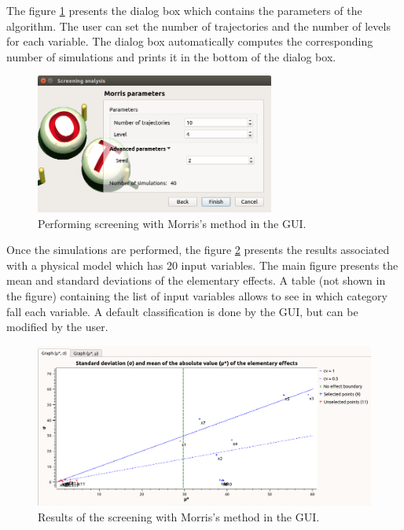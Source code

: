 \documentclass{uncecomp2019}
\begin{document}
The figure \ref{fig-morris} presents the dialog box which contains the parameters of the 
algorithm. 
The user can set the number of trajectories and the number of levels for each variable. 
The dialog box automatically computes the corresponding number of simulations and prints 
it in the bottom of the dialog box. 

\begin{figure}
\centering
\includegraphics[width=0.7\textwidth]{figures/morris_wizard_3rd_page.png}
\caption{Performing screening with Morris's method in the GUI.}
\label{fig-morris}
\end{figure}

Once the simulations are performed, the figure \ref{fig-morrisresultats} presents the results 
associated with a physical model which has 20 input variables. 
The main figure presents the mean and standard deviations of the elementary effects. 
A table (not shown in the figure) containing the list of input variables allows 
to see in which category fall each variable. 
A default classification is done by the GUI, but can be modified by the user. 

\begin{figure}
\centering
\includegraphics[width=\textwidth]{figures/morrisResultWindow-up.png}
\caption{Results of the screening with Morris's method in the GUI.}
\label{fig-morrisresultats}
\end{figure}
\end{document}
